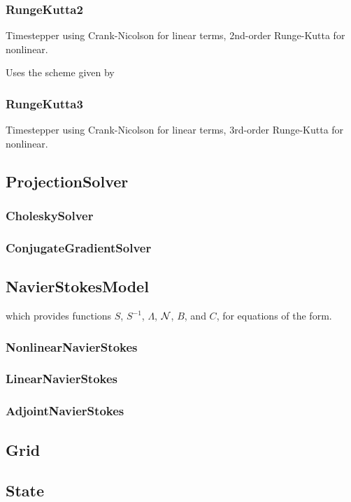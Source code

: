 \documentclass[11pt]{article}
\begin{document}
\subsubsection{RungeKutta2}
Timestepper using Crank-Nicolson for linear terms, 2nd-order Runge-Kutta for nonlinear.

Uses the scheme given by\cite{Peyret}

\subsubsection{RungeKutta3}
Timestepper using Crank-Nicolson for linear terms, 3rd-order Runge-Kutta for nonlinear.

\subsection{ProjectionSolver}

\subsubsection{CholeskySolver}
\subsubsection{ConjugateGradientSolver}

\subsection{NavierStokesModel}
which provides functions 
$S$, $S^{-1}$, $\Lambda$, $\cal{N}$, $B$, and $C$, for equations of the form.
\subsubsection{NonlinearNavierStokes}
\subsubsection{LinearNavierStokes}
\subsubsection{AdjointNavierStokes}

\subsection{Grid}

\subsection{State}
\end{document}
